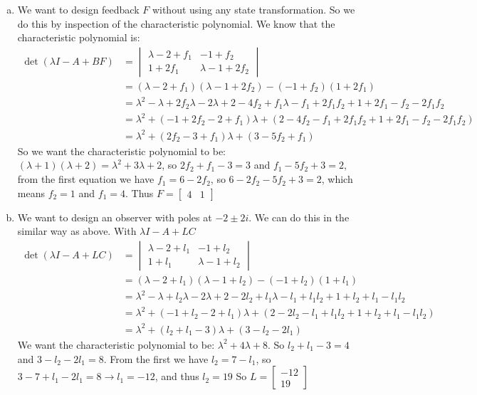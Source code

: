 \documentclass[11pt]{article}
\begin{document}
\begin{enumerate}[a)]
    \item We want to design feedback $F$ without using any state transformation.
    So we do this by inspection of the characteristic polynomial.
    We know that the characteristic polynomial is:
    \begin{align*}
        \det(\lambda I - A + BF) &= \begin{vmatrix}
            \lambda - 2 + f_1 & -1 + f_2 \\ 1 + 2f_1 & \lambda - 1 + 2f_2
        \end{vmatrix} \\
        &= (\lambda - 2 + f_1)(\lambda - 1 + 2f_2) - (-1 + f_2)(1 + 2f_1) \\
        &= \lambda^2 - \lambda + 2f_2 \lambda -2 \lambda + 2 - 4 f_2 + f_1 \lambda - f_1 + 2f_1 f_2 + 1 + 2f_1 - f_2 -2f_1f_2 \\
        &= \lambda^2 + (-1 + 2f_2 -2 + f_1)\lambda + (2 - 4f_2 - f_1 + 2f_1f_2 + 1 + 2f_1 - f_2 -2f_1f_2) \\
        &= \lambda^2 + (2f_2 - 3 + f_1)\lambda + (3 -5f_2 + f_1)
    \end{align*}
    So we want the characteristic polynomial to be:
    $(\lambda + 1)(\lambda + 2) = \lambda^2 + 3 \lambda + 2$,
    so $2f_2 + f_1 -3 = 3$ and $f_1 - 5f_2 + 3 = 2$,
    from the first equation we have $f_1 = 6 - 2f_2$, so $6 - 2f_2 - 5f_2 + 3 = 2$,
    which means $f_2 = 1$ and $f_1 = 4$.
    Thus $F = \begin{bmatrix}
        4 & 1
    \end{bmatrix}$

    \item We want to design an observer with poles at $-2 \pm 2i$.
    We can do this in the similar way as above.
    With $\lambda I - A + LC$
    \begin{align*}
        \det(\lambda I - A + LC) &= \begin{vmatrix}
            \lambda - 2 + l_1 & -1 + l_2 \\ 1 + l_1 & \lambda - 1 + l_2
        \end{vmatrix} \\
        &= (\lambda - 2 + l_1)(\lambda - 1 + l_2) - (-1 + l_2)(1 + l_1) \\
        &= \lambda^2 - \lambda + l_2 \lambda -2 \lambda + 2 - 2 l_2 + l_1 \lambda - l_1 + l_1 l_2 +1 + l_2 +l_1 -l_1l_2 \\
        &= \lambda^2 + (-1 + l_2 -2 + l_1)\lambda + (2 - 2l_2 - l_1 + l_1l_2 + 1 + l_2 +l_1 -l_1l_2) \\
        &= \lambda^2 + (l_2 + l_1 - 3)\lambda + (3 - l_2 - 2l_1)
    \end{align*}
    We want the characteristic polynomial to be:
    $\lambda^2 + 4 \lambda + 8$.
    So $l_2 + l_1 -3 = 4$ and $3 - l_2 -2l_1 = 8$.
    From the first we have $l_2 = 7 - l_1$,
    so $3 - 7 + l_1 - 2l_1 = 8 \to l_1 = -12$, and thus $l_2 = 19$
    So $L = \begin{bmatrix}
        -12 \\ 19
    \end{bmatrix}$


\end{enumerate}
\end{document}
